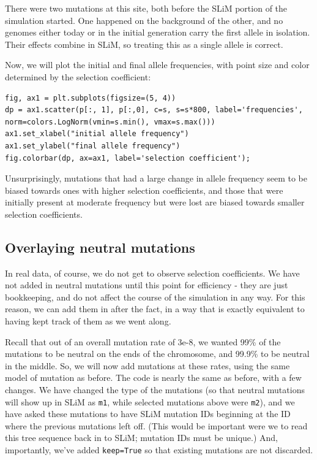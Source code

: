 \documentclass[12pt]{article}
\begin{document}
There were two mutations at this site, both before the SLiM portion of the simulation started.
One happened on the background of the other, and no genomes either today or in the initial generation carry the first allele in isolation.
Their effects combine in SLiM, so treating this as a single allele is correct.

Now, we will plot the initial and final allele frequencies, with point size and color determined by the selection coefficient:

\begin{listing}[H]
    \begin{verbatim}
fig, ax1 = plt.subplots(figsize=(5, 4))
dp = ax1.scatter(p[:, 1], p[:,0], c=s, s=s*800, label='frequencies', norm=colors.LogNorm(vmin=s.min(), vmax=s.max()))
ax1.set_xlabel("initial allele frequency")
ax1.set_ylabel("final allele frequency")
fig.colorbar(dp, ax=ax1, label='selection coefficient');
    \end{verbatim}
\end{listing}

Unsurprisingly, mutations that had a large change in allele frequency seem to be biased towards ones with higher selection coefficients,
and those that were initially present at moderate frequency but were lost are biased towards smaller selection coefficients.

\subsection*{Overlaying neutral mutations}

In real data, of course, we do not get to observe selection coefficients.
We have not added in neutral mutations until this point for efficiency - they are just bookkeeping,
and do not affect the course of the simulation in any way.
For this reason, we can add them in after the fact,
in a way that is exactly equivalent to having kept track of them as we went along.

Recall that out of an overall mutation rate of 3e-8,
we wanted 99\% of the mutations to be neutral on the ends of the chromosome,
and 99.9\% to be neutral in the middle.
So, we will now add mutations at these rates, using the same model of mutation as before.
The code is nearly the same as before, with a few changes.
We have changed the type of the mutations (so that neutral mutations will show up in SLiM as \verb|m1|,
while selected mutations above were \verb|m2|),
and we have asked these mutations to have SLiM mutation IDs beginning at the ID where the previous mutations left off.
(This would be important were we to read this tree sequence back in to SLiM;
mutation IDs must be unique.)
And, importantly, we’ve added \verb|keep=True| so that existing mutations are not discarded.
\end{document}
